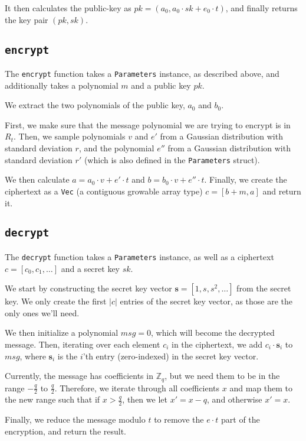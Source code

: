 \documentclass[../main.tex]{subfiles}
\begin{document}
It then calculates the public-key as $pk = (a_0, a_0 \cdot sk + e_0 \cdot t)$, and finally returns the key pair $(pk, sk)$.

\subsection{\lstinline{encrypt}}

The \lstinline{encrypt} function takes a \lstinline{Parameters} instance, as described above, and additionally takes a polynomial $m$ and a public key $pk$.

We extract the two polynomials of the public key, $a_0$ and $b_0$.

First, we make sure that the message polynomial we are trying to encrypt is in $R_t$.
Then, we sample polynomials $v$ and $e'$ from a Gaussian distribution with standard deviation $r$, and the polynomial $e''$ from a Gaussian distribution with standard deviation $r'$ (which is also defined in the \lstinline{Parameters} struct).

We then calculate $a = a_0 \cdot v + e' \cdot t$ and $b = b_0 \cdot v + e'' \cdot t$.
Finally, we create the ciphertext as a \lstinline{Vec} (a contiguous growable array type) $c = [b + m, a]$ and return it.

\subsection{\lstinline{decrypt}}

The \lstinline{decrypt} function takes a \lstinline{Parameters} instance, as well as a ciphertext $c = [c_0, c_1, \dots]$ and a secret key $sk$.

We start by constructing the secret key vector $\mathbf{s} = [1, s, s^2, \dots]$ from the secret key.
We only create the first $|c|$ entries of the secret key vector, as those are the only ones we'll need.

We then initialize a polynomial $msg = 0$, which will become the decrypted message.
Then, iterating over each element $c_i$ in the ciphertext, we add $c_i \cdot \mathbf{s}_i$ to $msg$, where $\mathbf{s}_i$ is the $i$'th entry (zero-indexed) in the secret key vector.

Currently, the message has coefficients in $\mathbb{Z}_q$, but we need them to be in the range $-\frac{q}{2}$ to $\frac{q}{2}$.
Therefore, we iterate through all coefficients $x$ and map them to the new range such that if $x > \frac{q}{2}$, then we let $x' = x - q$, and otherwise $x' = x$.

Finally, we reduce the message modulo $t$ to remove the $e \cdot t$ part of the encryption, and return the result.
\end{document}
